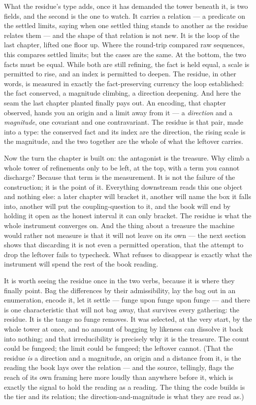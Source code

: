 What the residue's type adds, once it has demanded the tower beneath it, is two fields, and the second is the one to
watch. It carries a relation --- a predicate on the settled limits, saying when one settled thing stands to another as
the residue relates them --- and the shape of that relation is not new. It is the loop of the last chapter, lifted one
floor up. Where the round-trip compared raw sequences, this compares settled limits; but the cases are the same. At
the bottom, the two facts must be equal. While both are still refining, the fact is held equal, a scale is permitted
to rise, and an index is permitted to deepen. The residue, in other words, is measured in exactly the fact-preserving
currency the loop established: the fact conserved, a magnitude climbing, a direction deepening. And here the seam the
last chapter planted finally pays out. An encoding, that chapter observed, hands you an origin and a limit away from
it --- a \emph{direction} and a \emph{magnitude}, one covariant and one contravariant. The residue is that pair, made
into a type: the conserved fact and its index are the direction, the rising scale is the magnitude, and the two
together are the whole of what the leftover carries.

Now the turn the chapter is built on: the antagonist is the treasure. Why climb a whole tower of refinements only to
be left, at the top, with a term you cannot discharge? Because that term is the measurement. It is not the failure of
the construction; it is the point of it. Everything downstream reads this one object and nothing else: a later chapter
will bracket it, another will name the box it falls into, another will put the coupling-question to it, and the book
will end by holding it open as the honest interval it can only bracket. The residue is what the whole instrument
converges on. And the thing about a treasure the machine would rather not measure is that it will not leave on its own
--- the next section shows that discarding it is not even a permitted operation, that the attempt to drop the leftover
fails to typecheck. What refuses to disappear is exactly what the instrument will spend the rest of the book reading.

It is worth seeing the residue once in the two verbs, because it is where they finally point. Bag the differences by
their admissibility, lay the bag out in an enumeration, encode it, let it settle --- funge upon funge upon funge ---
and there is one characteristic that will not bag away, that survives every gathering: the residue. It is the tange no
funge removes. It was selected, at the very start, by the whole tower at once, and no amount of bagging by likeness
can dissolve it back into nothing; and that irreducibility is precisely why it is the treasure. The count could be
fungeed; the limit could be fungeed; the leftover cannot. (That the residue \emph{is} a direction and a magnitude, an
origin and a distance from it, is the reading the book lays over the relation --- and the source, tellingly, flags the
reach of its own framing here more loudly than anywhere before it, which is exactly the signal to hold the reading as
a reading. The thing the code builds is the tier and its relation; the direction-and-magnitude is what they are read
as.)

